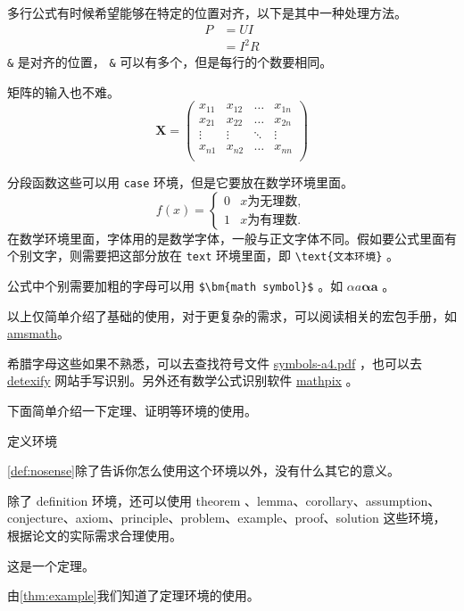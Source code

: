 多行公式有时候希望能够在特定的位置对齐，以下是其中一种处理方法。
\begin{align}
P & = UI \\
& = I^2R
\end{align}
\verb|&| 是对齐的位置， \verb|&| 可以有多个，但是每行的个数要相同。

矩阵的输入也不难。
\[
\mathbf{X} = \left(
    \begin{array}{cccc}
    x_{11} & x_{12} & \ldots & x_{1n}\\
    x_{21} & x_{22} & \ldots & x_{2n}\\
    \vdots & \vdots & \ddots & \vdots\\
    x_{n1} & x_{n2} & \ldots & x_{nn}\\
    \end{array} \right)
\]

分段函数这些可以用 \verb|case| 环境，但是它要放在数学环境里面。
\[
f(x) =
    \begin{cases}
        0 &  x \text{为无理数} ,\\
        1 &  x \text{为有理数} .
    \end{cases}
\]
在数学环境里面，字体用的是数学字体，一般与正文字体不同。假如要公式里面有个别文字，则需要把这部分放在 \verb|text| 环境里面，即 \verb|\text{文本环境}| 。

公式中个别需要加粗的字母可以用 \verb|$\bm{math symbol}$| 。如 $ \alpha a\bm{\alpha a} $ 。

以上仅简单介绍了基础的使用，对于更复杂的需求，可以阅读相关的宏包手册，如 \href{http://texdoc.net/texmf-dist/doc/latex/amsmath/amsldoc.pdf}{amsmath}。

希腊字母这些如果不熟悉，可以去查找符号文件 \href{http://mirrors.ctan.org/info/symbols/comprehensive/symbols-a4.pdf}{symbols-a4.pdf} ，也可以去 \href{http://detexify.kirelabs.org/classify.html}{detexify} 网站手写识别。另外还有数学公式识别软件 \href{https://mathpix.com/}{mathpix} 。

下面简单介绍一下定理、证明等环境的使用。
\begin{definition}
    定义环境
    \label{def:nosense}
\end{definition}
\cref{def:nosense}除了告诉你怎么使用这个环境以外，没有什么其它的意义。

除了 definition 环境，还可以使用 theorem 、lemma、corollary、assumption、conjecture、axiom、principle、problem、example、proof、solution 这些环境，根据论文的实际需求合理使用。

\begin{theorem}
    这是一个定理。
    \label{thm:example}
\end{theorem}
由\cref{thm:example}我们知道了定理环境的使用。

